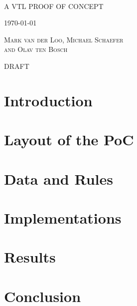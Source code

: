 \documentclass[fancyheadings,11pt]{book}
\begin{document}
\begin{center}
\thispagestyle{empty}
 \ \ \

\bigskip
\bigskip

{\huge
\textsc{A VTL PROOF OF CONCEPT}
}

\vspace{0.5 cm}
\textsc{\today}

\vspace{1.8 cm}
\textsc{\Large Mark van der Loo, Michael Schaefer\\and Olav ten Bosch}


\vspace{2 cm}
\textsc{\Large DRAFT}

\end{center}

\newpage
\thispagestyle{empty}

\frontmatter
\tableofcontents

%

\mainmatter

\chapter{Introduction}
\label{introduction}


\chapter{Layout of the PoC}
\label{layoutpoc}
\noindent


\chapter{Data and Rules}
\label{datarules}
\noindent


\chapter{Implementations}
\label{implementations}
\noindent


\chapter{Results}
\label{results}
\noindent


\chapter{Conclusion}
\label{conclusion}
\noindent


\backmatter


%



\end{document}
